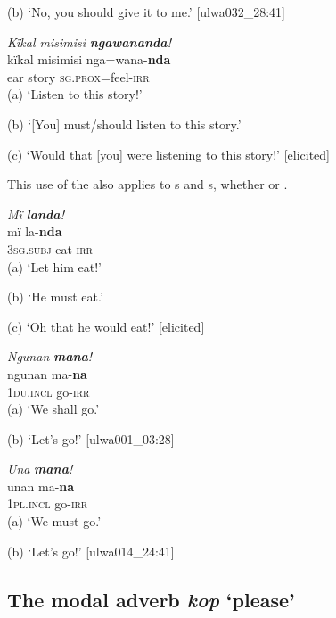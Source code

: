     (b) ‘No, you should give it to me.’ [ulwa032\_28:41]
\z

\ea%
    \label{ex:syntax:88}
          \textit{Kïkal misimisi} \textbf{\textit{ngawananda}}\textit{!}\\
\gll    kïkal  misimisi  nga=wana-\textbf{nda}\\
    ear    story    \textsc{sg.prox}=feel-\textsc{irr}\\
\glt    (a) ‘Listen to this story!’

    (b) ‘[You] must/should listen to this story.’

    (c) ‘Would that [you] were listening to this story!’ [elicited]
\z

This use of the   also applies to s  and s, whether   or  .


\ea%
    \label{ex:syntax:89}
          \textit{Mï} \textbf{\textit{landa}}\textit{!}\\
\gll    mï      la-\textbf{nda}\\
    \textsc{3sg.subj}  eat-\textsc{irr}\\
\glt    (a) ‘Let him eat!’

    (b) ‘He must eat.’

    (c) ‘Oh that he would eat!’ [elicited]
\z

\ea%
    \label{ex:syntax:90}
          \textit{Ngunan} \textbf{\textit{mana}}\textit{!}\\
\gll    ngunan    ma-\textbf{na}\\
    1\textsc{du.incl}  go-\textsc{irr}\\
\glt    (a) ‘We shall go.’

    (b) ‘Let’s go!’ [ulwa001\_03:28]
\z

\ea%
    \label{ex:syntax:91}
          \textit{Una} \textbf{\textit{mana}}\textit{!}\\
\gll    unan    ma-\textbf{na}\\
    1\textsc{pl.incl}  go-\textsc{irr}\\
\glt    (a) ‘We must go.’

    (b) ‘Let’s go!’ [ulwa014\_24:41]
\z


\subsection{The modal adverb \textit{kop} ‘please’}\label{sec:13.2.2}

